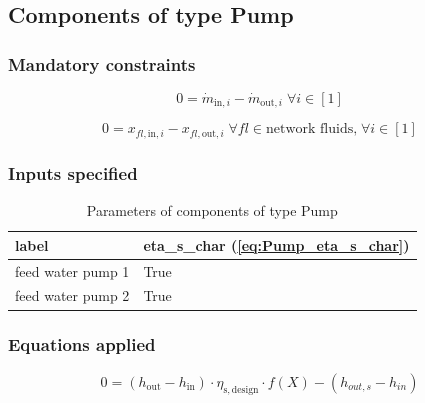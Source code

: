 \subsection{Components of type Pump}

\subsubsection{Mandatory constraints}

\begin{equation}
\label{eq:Pump_mass_flow_constraints}
0=\dot{m}_{\mathrm{in,}i}-\dot{m}_{\mathrm{out,}i}\; \forall i \in [1]
\end{equation}

\begin{equation}
\label{eq:Pump_fluid_constraints}
0=x_{fl\mathrm{,in,}i}-x_{fl\mathrm{,out,}i}\;\forall fl \in\text{network fluids,}\; \forall i \in [1]
\end{equation}


\subsubsection{Inputs specified}

\begin{table}[H]\begin{center}
\begin{tabular}{ll}
\toprule
             label &  eta\_s\_char (\ref{eq:Pump_eta_s_char}) \\
\midrule
 feed water pump 1 &                                     True \\
 feed water pump 2 &                                     True \\
\bottomrule
\end{tabular}
\caption{Parameters of components of type Pump}
\end{center}\end{table}

\subsubsection{Equations applied}

\begin{equation}
\label{eq:Pump_eta_s_char}
0=\left(h_\mathrm{out}-h_\mathrm{in}\right)\cdot\eta_\mathrm{s,design}\cdot f\left( X \right)-\left( h_{out,s} - h_{in} \right)
\end{equation}

